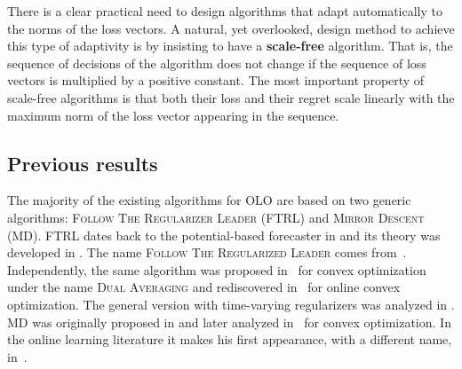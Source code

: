 \addtocounter{footnote}{-2} 



There is a clear practical need to design algorithms that adapt automatically
to the norms of the loss vectors.  A natural, yet overlooked, design method to
achieve this type of adaptivity is by insisting to have a \textbf{scale-free}
algorithm.  That is, the sequence of decisions of the algorithm does not change
if the sequence of loss vectors is multiplied by a positive constant.  The most
important property of scale-free algorithms is that both their loss and their
regret scale linearly with the maximum norm of the loss vector appearing in the
sequence.

\subsection{Previous results}

The majority of the existing algorithms for OLO are based on two generic algorithms:
\textsc{Follow The Regularizer Leader} (\textsc{FTRL}) and \textsc{Mirror
Descent} (\textsc{MD}). \textsc{FTRL} dates back to the potential-based
forecaster in \cite[Chapter~11]{Cesa-Bianchi-Lugosi-2006} and its theory was
developed in \cite{Shalev-Shwartz-2007}.  The name \textsc{Follow The
Regularized Leader} comes from~\cite{Abernethy-Hazan-Rakhlin-2008}.
Independently, the same algorithm was proposed in~\cite{Nestorov-2009} for
convex optimization under the name \textsc{Dual Averaging} and rediscovered
in~\cite{Xiao-2010} for online convex optimization. The general
version with time-varying regularizers was analyzed in
\cite{Orabona-Crammer-Cesa-Bianchi-2014}. \textsc{MD} was originally proposed
in \cite{Nemirovski-Yudin-1983} and later analyzed in~\cite{Beck-Teboulle-2003}
for convex optimization. In the online learning literature it makes his first
appearance, with a different name, in~\cite{Kivinen-Warmuth-1997}.

